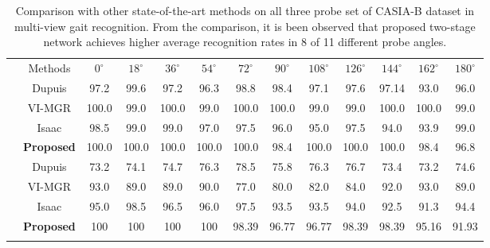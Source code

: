 \begin{table}
	\centering
	\caption [Comparison with other state-of-the-art methods on all three probe set of CASIA-B dataset in multi-view gait recognition]
	{Comparison with other state-of-the-art methods on all three probe set of CASIA-B dataset in multi-view gait recognition. From the comparison, it is been observed that proposed two-stage network achieves higher average recognition rates in 8 of 11 different probe angles.\label{table:comp_multi_view}}
	\setlength{\tabcolsep}{3.5pt}
	\small
	{\begin{tabular*}{\textwidth}{|c|c|cccc cccc ccc|} \cline{1-13}\rule{0pt}{3ex}
		&Methods &${0^{\circ}}$ &${18^{\circ}}$  &${36^{\circ}}$ &${54^{\circ}}$ &${72^{\circ}}$	&${90^{\circ}}$	&${108^{\circ}}$ &${126^{\circ}}$ &${144^{\circ}}$ &${162^{\circ}}$  &${180^{\circ}}$ \\\cline{1-13}\rule{0pt}{3ex}
					
		\multirow{4}{*}{\rotatebox{90}{Normal}} &Dupuis &97.2 &99.6 &97.2 &96.3 &98.8 &98.4 &97.1 &97.6 &97.14 &93.0 &96.0 \\\rule{0pt}{3ex}
		
		&VI-MGR &100.0 &99.0 &100.0 &99.0 &100.0 &100.0 &99.0 &99.0 &100.0 &100.0 &99.0 \\ \rule{0pt}{3ex}
		
		&Isaac &98.5 &99.0 &99.0 &97.0 &97.5 &96.0 &95.0 &97.5 &94.0 &93.9 &99.0 \\\rule{0pt}{3ex}
		
		&\textbf{Proposed} &100.0  &100.0  &100.0  &100.0  &100.0  &98.4  &100.0  &100.0  &100.0  &98.4  &96.8 \\\cline{1-13}\rule{0pt}{3ex}
	
	
	
		\multirow{4}{*}{\rotatebox{90}{Bag}} &Dupuis &73.2 &74.1 &74.7 &76.3 &78.5 &75.8 &76.3 &76.7 &73.4 &73.2 &74.6 \\\rule{0pt}{3ex} 

		&VI-MGR &93.0 &89.0 &89.0 &90.0 &77.0 &80.0 &82.0 &84.0 &92.0 &93.0 &89.0 \\\rule{0pt}{3ex}

		&Isaac &95.0 &98.5 &96.5 &96.0 &97.5 &93.5 &93.5 &94.0 &92.5 &91.3 &94.4 \\\rule{0pt}{3ex}

		&\textbf{Proposed}  &100 &100 &100 &100 &98.39 &96.77 &96.77 &98.39 &98.39 &95.16 &91.93 \\\hline\rule{0pt}{3ex}



\end{tabular*}}
\end{table}
